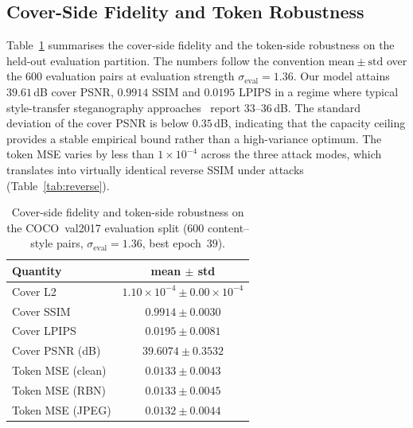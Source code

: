 \documentclass[conference]{IEEEtran}
\begin{document}
\subsection{Cover-Side Fidelity and Token Robustness}
\label{sec:exp_coco}
Table~\ref{tab:cover} summarises the cover-side fidelity and the token-side robustness on the held-out evaluation partition. The numbers follow the convention $\mathrm{mean}\pm\mathrm{std}$ over the $600$ evaluation pairs at evaluation strength $\sigma_{\text{eval}}\!=\!1.36$. Our model attains $39.61$\,dB cover PSNR, $0.9914$ SSIM and $0.0195$ LPIPS in a regime where typical style-transfer steganography approaches~\cite{stylestegan2023, sst2024, stisgan2026} report $33$--$36$\,dB. The standard deviation of the cover PSNR is below $0.35$\,dB, indicating that the capacity ceiling provides a stable empirical bound rather than a high-variance optimum. The token MSE varies by less than $1\!\times\!10^{-4}$ across the three attack modes, which translates into virtually identical reverse SSIM under attacks (Table~\ref{tab:reverse}).

\begin{table}[t]
\centering
\caption{Cover-side fidelity and token-side robustness on the COCO~val2017 evaluation split ($600$ content--style pairs, $\sigma_{\text{eval}}=1.36$, best epoch~$39$).}
\label{tab:cover}
\setlength{\tabcolsep}{4pt}
\begin{tabular}{l c}
\toprule
\textbf{Quantity} & \textbf{mean $\pm$ std} \\
\midrule
Cover L2          & $1.10\!\times\!10^{-4} \pm 0.00\!\times\!10^{-4}$ \\
Cover SSIM        & $0.9914 \pm 0.0030$ \\
Cover LPIPS       & $0.0195 \pm 0.0081$ \\
Cover PSNR (dB)   & $\mathbf{39.6074 \pm 0.3532}$ \\
\midrule
Token MSE (clean) & $0.0133 \pm 0.0043$ \\
Token MSE (RBN)   & $0.0133 \pm 0.0045$ \\
Token MSE (JPEG)  & $0.0132 \pm 0.0044$ \\
\bottomrule
\end{tabular}
\end{table}
\end{document}
